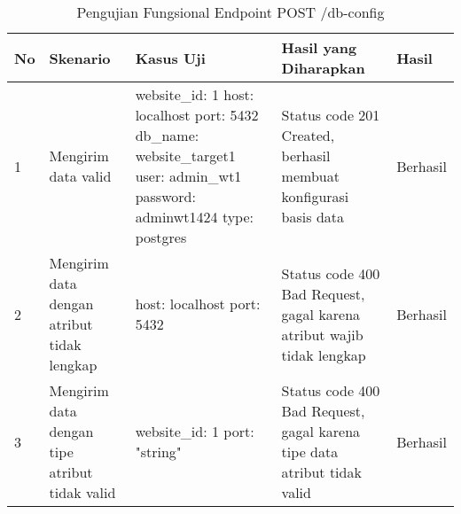 \begin{table}[H]
    \centering
    \begin{tabular}{|p{0.5cm}|p{3cm}|p{5cm}|p{5cm}|p{1.5cm}|}
        \hline
        \rowcolor[HTML]{DAE8FC} 
        \textbf{No} & \textbf{Skenario} & \textbf{Kasus Uji} & \textbf{Hasil yang Diharapkan} & \textbf{Hasil} \\ \hline
        1 & Mengirim data valid & 
        website\_id: 1 \newline host: localhost \newline port: 5432 \newline db\_name: website\_target1 \newline user: admin\_wt1 \newline password: adminwt1424 \newline type: postgres & 
        Status code 201 Created, berhasil membuat konfigurasi basis data & 
        Berhasil \\ \hline
        2 & Mengirim data dengan atribut tidak lengkap & 
        host: localhost \newline port: 5432 & 
        Status code 400 Bad Request, gagal karena atribut wajib tidak lengkap & 
        Berhasil \\ \hline
        3 & Mengirim data dengan tipe atribut tidak valid & 
        website\_id: 1 \newline port: "string" & 
        Status code 400 Bad Request, gagal karena tipe data atribut tidak valid & 
        Berhasil \\ \hline
    \end{tabular}
    \caption{Pengujian Fungsional Endpoint POST /db-config}
    \label{tab:db_config_post_testing}
\end{table}
